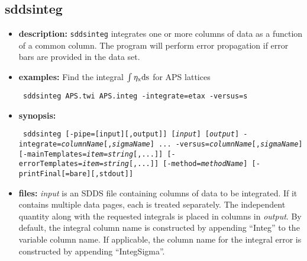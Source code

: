 \newpage
\subsection{sddsinteg}
\label{sddsinteg}

\begin{itemize}
\item {\bf description:}
{\tt sddsinteg} integrates one or more columns of data as a function of a common
column.  The program will perform error propagation if error bars are provided in 
the data set.
\item {\bf examples:} 
Find the integral ${\rm \int \eta_x ds}$ for APS lattices
\begin{flushleft}{\tt
sddsinteg APS.twi APS.integ -integrate=etax -versus=s
}\end{flushleft}
\item {\bf synopsis:} 
\begin{flushleft}{\tt
sddsinteg [-pipe=[input][,output]] [{\em input}] [{\em output}]
-integrate={\em columnName}[,{\em sigmaName}] ...
-versus={\em columnName}[,{\em sigmaName}] [-mainTemplates={\em item}={\em string}[,...]] 
[-errorTemplates={\em item}={\em string}[,...]] 
[-method={\em methodName}] [-printFinal[=bare][,stdout]]
}\end{flushleft}
\item {\bf files:}
{\em input} is an SDDS file containing columns of data to be
integrated.  If it contains multiple data pages, each is treated
separately. The independent quantity along with the requested integrals
is placed in columns in {\em output}.  By default, the
integral column name is constructed by appending ``Integ'' to the
variable column name.  If applicable, the column name for the
integral error is constructed by appending ``IntegSigma''.  


\end{itemize}
